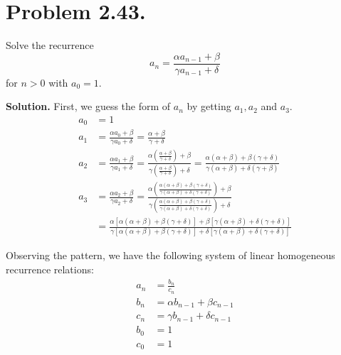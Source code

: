 \documentclass[a4paper, 11pt]{article}
\begin{document}
\section{Problem 2.43.} Solve the recurrence
\begin{equation*}
a_n = \frac{\alpha a_{n-1} + \beta}{\gamma a_{n-1} + \delta}
\end{equation*}
for $n>0$ with $a_0=1$.

\textbf{Solution.} First, we guess the form of $a_n$ by getting $a_1, a_2$ and $a_3$.
\begin{align*}
a_0 &= 1\\
a_1 &= \frac{\alpha a_0 + \beta}{\gamma a_0 + \delta} = \frac{\alpha + \beta}{\gamma + \delta}\\
a_2 &= \frac{\alpha a_1 + \beta}{\gamma a_1 + \delta} = \frac{\alpha \left(\frac{\alpha + \beta}{\gamma + \delta}\right) + \beta}{\gamma \left(\frac{\alpha + \beta}{\gamma + \delta}\right) + \delta} = \frac{\alpha (\alpha + \beta) + \beta (\gamma + \delta)}{\gamma (\alpha + \beta) + \delta (\gamma + \beta)}\\
a_3 &= \frac{\alpha a_2 + \beta}{\gamma a_2 + \delta} = \frac{\alpha \left(\frac{\alpha (\alpha + \beta) + \beta (\gamma + \delta)}{\gamma (\alpha + \beta) + \delta (\gamma + \delta)}\right) + \beta}{\gamma \left(\frac{\alpha (\alpha + \beta) + \beta (\gamma + \delta)}{\gamma (\alpha + \beta) + \delta (\gamma + \delta)}\right) + \delta}\\ &= \frac{\alpha \left[\alpha (\alpha + \beta) + \beta (\gamma + \delta)\right] + \beta \left[\gamma (\alpha + \beta) + \delta (\gamma + \delta)\right]}{\gamma \left[\alpha (\alpha + \beta) + \beta (\gamma + \delta)\right] + \delta \left[\gamma (\alpha + \beta) + \delta (\gamma + \delta)\right]}
\end{align*}

Observing the pattern, we have the following system of linear homogeneous recurrence relations:
\begin{align*}
a_n &= \frac{b_n}{c_n}\\
b_n &= \alpha b_{n-1} + \beta c_{n-1}\\
c_n &= \gamma b_{n-1} + \delta c_{n-1}\\
b_0 &= 1\\
c_0 &= 1
\end{align*}
\end{document}
